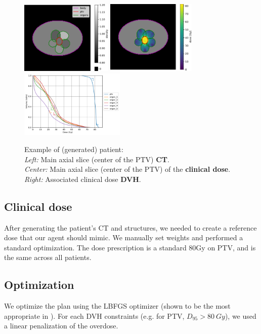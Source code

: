 \begin{figure}
	\centering
	\label{fig:main_slice-ct}	\includegraphics[height=3.5cm]{main_slice-ct.pdf}
	\hspace{0.3cm}
	\label{fig:main_slice-dose}
	\includegraphics[height=3.5cm]{main_slice-dose.pdf}
	\hspace{0.1cm}
	\label{fig:clinical_dvh}
	\includegraphics[width=5cm]{dvh_example.pdf}
	\caption{
		Example of (generated) patient: \\
		\textit{Left:} Main axial slice (center of the PTV) \textbf{CT}.\\
		\textit{Center:} Main axial slice (center of the PTV) of the \textbf{clinical dose}. \\
		\textit{Right:} Associated clinical dose \textbf{DVH}.
	}

\end{figure}

\subsection*{Clinical dose}
After generating the patient's CT and structures, we needed to create a reference dose that our agent should mimic.
We manually set weights and performed a standard optimization.
The dose prescription is a standard 80Gy on PTV, and is the same across all patients.


\subsection*{Optimization}
We optimize the plan using the LBFGS optimizer (shown to be the most appropriate in \cite{dubois_radiotherapy_2023}).
For each DVH constraints (e.g. for PTV, $D_{95}>80 \ Gy$), we used a linear penalization of the overdose.
